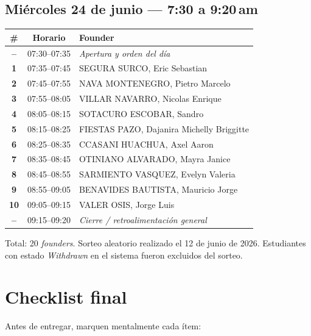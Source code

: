 \documentclass[11pt,a4paper]{article}
\begin{document}
\bigskip
\subsection*{Mi\'ercoles 24 de junio --- 7:30 a 9:20\,am}

\begin{tabularx}{\linewidth}{@{}>{\bfseries\color{clawOrange}}c >{\ttfamily\small}c X@{}}
\toprule
\textcolor{clawDark}{\#} & \textcolor{clawDark}{\bfseries\rmfamily Horario} & \textcolor{clawDark}{\bfseries Founder} \\
\midrule
--  & 07:30--07:35 & \emph{Apertura y orden del d\'ia} \\
1   & 07:35--07:45 & SEGURA SURCO, Eric Sebastian \\
2   & 07:45--07:55 & NAVA MONTENEGRO, Pietro Marcelo \\
3   & 07:55--08:05 & VILLAR NAVARRO, Nicolas Enrique \\
4   & 08:05--08:15 & SOTACURO ESCOBAR, Sandro \\
5   & 08:15--08:25 & FIESTAS PAZO, Dajanira Michelly Briggitte \\
6   & 08:25--08:35 & CCASANI HUACHUA, Axel Aaron \\
7   & 08:35--08:45 & OTINIANO ALVARADO, Mayra Janice \\
8   & 08:45--08:55 & SARMIENTO VASQUEZ, Evelyn Valeria \\
9   & 08:55--09:05 & BENAVIDES BAUTISTA, Mauricio Jorge \\
10  & 09:05--09:15 & VALER OSIS, Jorge Luis \\
--  & 09:15--09:20 & \emph{Cierre / retroalimentaci\'on general} \\
\bottomrule
\end{tabularx}

\medskip
\noindent\small\textcolor{clawGray}{Total: 20 \emph{founders}. Sorteo aleatorio
realizado el 12 de junio de 2026. Estudiantes con estado \emph{Withdrawn} en el
sistema fueron excluidos del sorteo.}

\section{Checklist final}

Antes de entregar, marquen mentalmente cada \'item:
\end{document}
